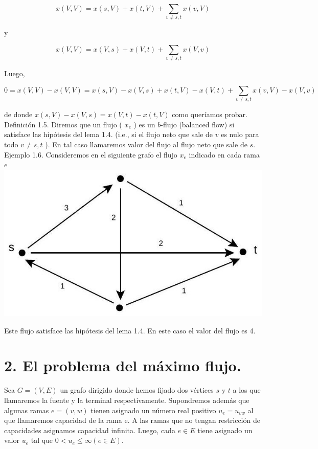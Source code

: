 \documentclass[10pt]{article}
\begin{document}
$$
x(V, V)=x(s, V)+x(t, V)+\sum_{v \neq s, t} x(v, V)
$$

y

$$
x(V, V)=x(V, s)+x(V, t)+\sum_{v \neq s, t} x(V, v)
$$

Luego,

$$
0=x(V, V)-x(V, V)=x(s, V)-x(V, s)+x(t, V)-x(V, t)+\sum_{v \neq s, t} x(v, V)-x(V, v)
$$

de donde $x(s, V)-x(V, s)=x(V, t)-x(t, V)$ como queríamos probar.\\
Definición 1.5. Diremos que un flujo ( $x_{e}$ ) es un $b$-flujo (balanced flow) si satisface las hipótesis del lema 1.4. (i.e., si el flujo neto que sale de $v$ es nulo para todo $v \neq s, t$ ). En tal caso llamaremos valor del flujo al flujo neto que sale de $s$.\\
Ejemplo 1.6. Consideremos en el siguiente grafo el flujo $x_{e}$ indicado en cada rama $e$\\
\includegraphics[max width=\textwidth, center]{2025_09_05_aa5f7b8425e7dd302062g-02}

Este flujo satisface las hipótesis del lema 1.4. En este caso el valor del flujo es 4.

\section*{2. El problema del máximo flujo.}
Sea $G=(V, E)$ un grafo dirigido donde hemos fijado dos vértices $s$ y $t$ a los que llamaremos la fuente y la terminal respectivamente. Supondremos además que algunas ramas $e=(v, w)$ tienen asignado un número real positivo $u_{e}=u_{v w}$ al que llamaremos capacidad de la rama e. A las ramas que no tengan restricción de capacidades asignamos capacidad infinita. Luego, cada $e \in E$ tiene asignado un valor $u_{e}$ tal que $0<u_{e} \leq \infty (e \in E)$.
\end{document}

